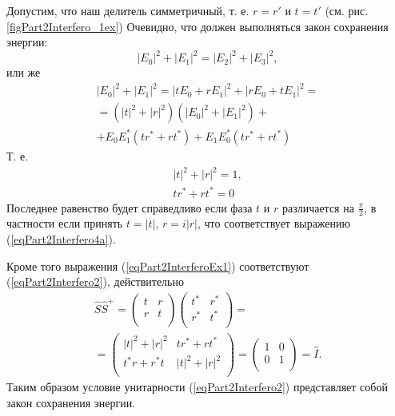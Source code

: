 \begin{example}
  
  
  Допустим, что наш делитель симметричный, т. е. $r=r'$ и $t = t'$
  (см. рис. \ref{figPart2Interfero_1ex})
  Очевидно, что должен выполняться закон сохранения энергии:
  \[
  \left|E_0\right|^2 + \left|E_1\right|^2 =
  \left|E_2\right|^2 + \left|E_3\right|^2, 
  \]
  или же
  \begin{eqnarray}
    \left|E_0\right|^2 + \left|E_1\right|^2 =
    \left|t E_0 + r E_1\right|^2 + \left|r E_0 + t E_1\right|^2 =
    \nonumber \\
    =
    \left(\left|t\right|^2 + \left|r\right|^2\right) 
    \left(\left|E_0\right|^2 + \left|E_1\right|^2\right) +
    \nonumber \\
    + E_0 E_1^\ast \left(t r^\ast + r t^\ast\right)
    + E_1 E_0^\ast \left(t r^\ast + r t^\ast\right)
    \nonumber
  \end{eqnarray}
  Т. е.
  \begin{eqnarray}
    \left|t\right|^2 + \left|r\right|^2 = 1,
    \nonumber \\
    t r^\ast + r t^\ast = 0
    \label{eqPart2InterferoEx1}
  \end{eqnarray}
  Последнее равенство будет справедливо если фаза $t$ и $r$
  различается на $\frac{\pi}{2}$, в частности если принять
  $t = \left|t\right|$, $r = i \left|r\right|$, что соответствует
  выражению (\ref{eqPart2Interfero4a}).

  Кроме того выражения (\ref{eqPart2InterferoEx1}) соответствуют
  (\ref{eqPart2Interfero2}), действительно
  \begin{eqnarray}
    \hat{S} \hat{S}^{+} = 
    \left(
    \begin{array}{cc}
      t & r \\
      r & t \\      
    \end{array}
    \right)
    \left(
    \begin{array}{cc}
      t^{*} & r^{*} \\
      r^{*} & t^{*} \\      
    \end{array}
    \right) =
    \nonumber \\
    =
    \left(
    \begin{array}{cc}
      \left|t\right|^2 + \left|r\right|^2 & t r^\ast + r t^\ast \\
      t^\ast r + r^\ast t & \left|t\right|^2 + \left|r\right|^2 \\
    \end{array}
    \right) =
    \left(
    \begin{array}{cc}
      1 & 0 \\
      0 & 1 \\
    \end{array}
    \right) = \hat{I}.
    \nonumber
  \end{eqnarray}
  Таким образом условие унитарности (\ref{eqPart2Interfero2})
  представляет собой закон сохранения энергии.
\end{example}



